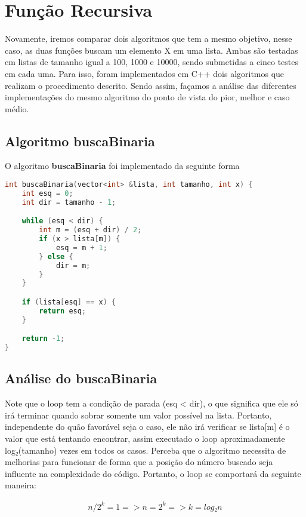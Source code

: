 \section{Função Recursiva}
\label{sec:func-rec}

Novamente, iremos comparar dois algoritmos que tem a mesmo objetivo, nesse caso, as duas funções buscam um elemento X em uma lista. Ambas são testadas em listas de tamanho igual a 100, 1000 e 10000, sendo submetidas a cinco testes em cada uma. Para isso, foram implementados em C++ dois algoritmos que realizam o procedimento descrito. Sendo assim, façamos a análise das diferentes implementações do mesmo algoritmo do ponto de vista do pior, melhor e caso médio.

\subsection{Algoritmo buscaBinaria}

O algoritmo \textbf{buscaBinaria} foi implementado da seguinte forma

\begin{lstlisting}[language=C++]
int buscaBinaria(vector<int> &lista, int tamanho, int x) {
    int esq = 0; 
    int dir = tamanho - 1;

    while (esq < dir) {
        int m = (esq + dir) / 2; 
        if (x > lista[m]) {
            esq = m + 1;
        } else {
            dir = m;
        }
    }

    if (lista[esq] == x) {
        return esq; 
    }

    return -1;
}
\end{lstlisting}

\subsection{Análise do buscaBinaria}

Note que o loop tem a condição de parada (esq < dir), o que significa que ele só irá terminar quando sobrar somente um valor possível na lista. Portanto, independente do quão favorável seja o caso, ele não irá verificar se lista[m] é o valor que está tentando encontrar, assim executado o loop aproximadamente log₂(tamanho) vezes em todos os casos. Perceba que o algoritmo necessita de melhorias para funcionar de forma que a posição do número buscado seja influente na complexidade do código. Portanto, o loop se comportará da seguinte maneira:

\begin{align*}
        n/2^k = 1 
       => n = 2^k
       => k = log₂ n
\end{align*}

